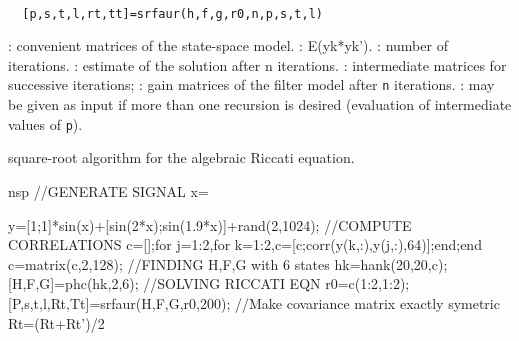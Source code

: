 
\begin{mandesc}
   \\ %
\end{mandesc}
\begin{calling_sequence}
\begin{verbatim}
  [p,s,t,l,rt,tt]=srfaur(h,f,g,r0,n,p,s,t,l)  
\end{verbatim}
\end{calling_sequence}
\begin{parameters}
  \begin{varlist}
    : convenient matrices of the state-space model.
    : E(yk*yk').
    : number of iterations.
    : estimate of the solution after n iterations.
    : intermediate matrices for  successive iterations;
    : gain matrices of the filter model after \verb!n! iterations.
    : may be given as input if more than one recursion is desired (evaluation of intermediate values of \verb!p!).
  \end{varlist}
\end{parameters}
\begin{mandescription}
  square-root algorithm for the algebraic Riccati equation.
\end{mandescription}
\begin{examples}
  \begin{mintednsp}{nsp}
    //GENERATE SIGNAL
    x=%

    y=[1;1]*sin(x)+[sin(2*x);sin(1.9*x)]+rand(2,1024);
    //COMPUTE CORRELATIONS
    c=[];for j=1:2,for k=1:2,c=[c;corr(y(k,:),y(j,:),64)];end;end
    c=matrix(c,2,128);
    //FINDING H,F,G with 6 states
    hk=hank(20,20,c);
    [H,F,G]=phc(hk,2,6);
    //SOLVING RICCATI EQN
    r0=c(1:2,1:2);
    [P,s,t,l,Rt,Tt]=srfaur(H,F,G,r0,200);
    //Make covariance matrix exactly symetric
    Rt=(Rt+Rt')/2
  \end{mintednsp}
\end{examples}
\begin{manseealso}
      
\end{manseealso}
